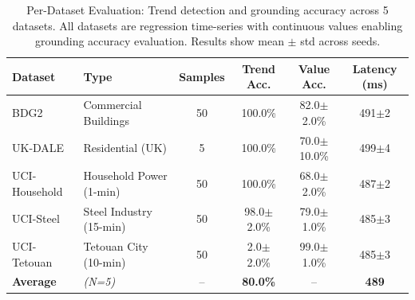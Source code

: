 \documentclass[letterpaper]{article}
\begin{document}
\begin{table}[t]
\centering
\caption{Per-Dataset Evaluation: Trend detection and grounding accuracy across 5 datasets.
All datasets are regression time-series with continuous values enabling grounding accuracy evaluation.
Results show mean $\pm$ std across seeds.}
\label{tab:per_dataset}
\begin{tabular}{l l c c c c}
\toprule
\textbf{Dataset} & \textbf{Type} & \textbf{Samples} & \textbf{Trend Acc.} & \textbf{Value Acc.} & \textbf{Latency (ms)} \\
\midrule
BDG2 & Commercial Buildings & 50 & 100.0\% & 82.0$\pm$2.0\% & 491$\pm$2 \\
UK-DALE & Residential (UK) & 5 & 100.0\% & 70.0$\pm$10.0\% & 499$\pm$4 \\
UCI-Household & Household Power (1-min) & 50 & 100.0\% & 68.0$\pm$2.0\% & 487$\pm$2 \\
UCI-Steel & Steel Industry (15-min) & 50 & 98.0$\pm$2.0\% & 79.0$\pm$1.0\% & 485$\pm$3 \\
UCI-Tetouan & Tetouan City (10-min) & 50 & 2.0$\pm$2.0\% & 99.0$\pm$1.0\% & 485$\pm$3 \\
\midrule
\textbf{Average} & \textit{(N=5)} & -- & \textbf{80.0\%} & -- & \textbf{489} \\

\bottomrule
\end{tabular}
\end{table}
\end{document}
